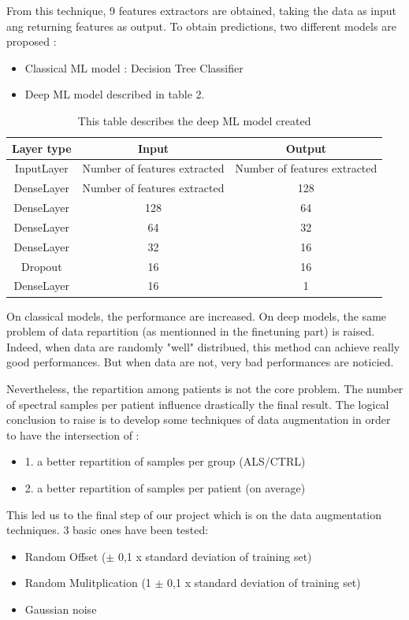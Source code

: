 From this technique, 9 features extractors are obtained, taking the data as input ang returning features as output. To obtain predictions, two different models are proposed :
\begin{itemize}
\item Classical ML model : Decision Tree Classifier
\item Deep ML model described in table 2.
\end{itemize}

\begin{table}[H]
\centering
\begin{threeparttable}
\caption{This table describes the deep ML model created}
\begin{tabular}{ |c|c|c| }
 \hline
  Layer type & Input & Output \\
  \hline
  InputLayer & Number of features extracted & Number of features extracted \\
  DenseLayer & Number of features extracted & 128 \\
  DenseLayer & 128 & 64 \\
  DenseLayer & 64 & 32 \\
  DenseLayer & 32 & 16 \\
  Dropout & 16 & 16 \\
  DenseLayer & 16 & 1 \\
  \hline
\end{tabular}
\end{threeparttable}
\end{table}

On classical models, the performance are increased. 
On deep models, the same problem of data repartition (as mentionned in the finetuning part) is raised. Indeed, when data are randomly "well" distribued, this method can achieve really good performances. But when data are not, very bad performances are noticied.

Nevertheless, the repartition among patients is not the core problem. The number of spectral samples per patient influence drastically the final result. 
The logical conclusion to raise is to develop some techniques of data augmentation in order to have the intersection of :
\begin{itemize}
\item 1. a better repartition of samples per group (ALS/CTRL)
\item 2. a better repartition of samples per patient (on average)
\end{itemize}
This led us to the final step of our project which is on the data augmentation techniques.
3 basic ones have been tested:
\begin{itemize}
\item Random Offset ($\pm$ 0,1 x standard deviation of training set)
\item Random Mulitplication (1 $\pm$ 0,1 x standard deviation of training set)
\item Gaussian noise
\end{itemize}

